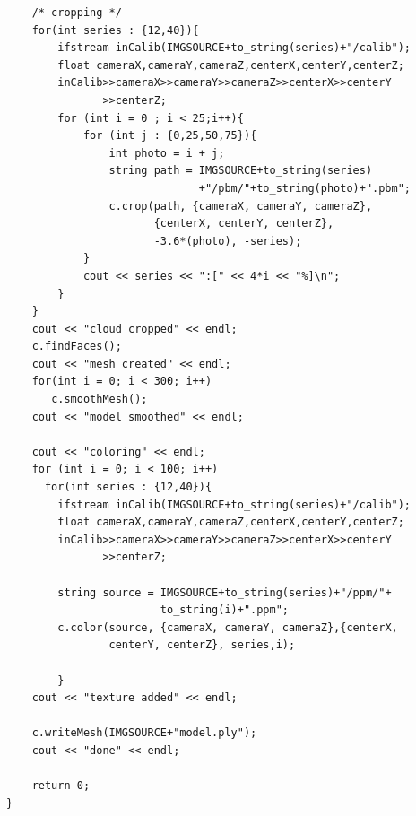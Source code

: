 \documentclass[12pt]{report}			%
\begin{document}
\begin{appendices}
\begin{lstlisting}
    /* cropping */
    for(int series : {12,40}){
        ifstream inCalib(IMGSOURCE+to_string(series)+"/calib");
        float cameraX,cameraY,cameraZ,centerX,centerY,centerZ;
        inCalib>>cameraX>>cameraY>>cameraZ>>centerX>>centerY
               >>centerZ;
        for (int i = 0 ; i < 25;i++){
            for (int j : {0,25,50,75}){
                int photo = i + j;
                string path = IMGSOURCE+to_string(series)
                              +"/pbm/"+to_string(photo)+".pbm"; 
                c.crop(path, {cameraX, cameraY, cameraZ},
                       {centerX, centerY, centerZ},
                       -3.6*(photo), -series);
            }
            cout << series << ":[" << 4*i << "%]\n";
        }
    }
    cout << "cloud cropped" << endl;
    c.findFaces();
    cout << "mesh created" << endl;
    for(int i = 0; i < 300; i++)
       c.smoothMesh();
    cout << "model smoothed" << endl;

    cout << "coloring" << endl;
    for (int i = 0; i < 100; i++)
      for(int series : {12,40}){
        ifstream inCalib(IMGSOURCE+to_string(series)+"/calib");
        float cameraX,cameraY,cameraZ,centerX,centerY,centerZ;
        inCalib>>cameraX>>cameraY>>cameraZ>>centerX>>centerY
               >>centerZ;
           
        string source = IMGSOURCE+to_string(series)+"/ppm/"+
                        to_string(i)+".ppm";
        c.color(source, {cameraX, cameraY, cameraZ},{centerX,
                centerY, centerZ}, series,i);
        
        }
    cout << "texture added" << endl;

    c.writeMesh(IMGSOURCE+"model.ply");
    cout << "done" << endl;

    return 0;    
}
        \end{lstlisting}


\end{appendices}
\end{document}
